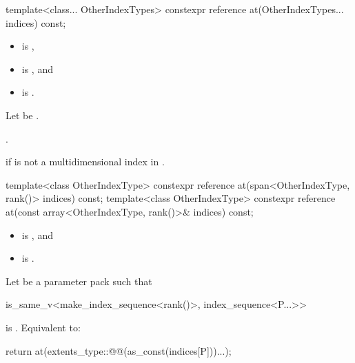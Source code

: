 %
\begin{itemdecl}
template<class... OtherIndexTypes>
  constexpr reference at(OtherIndexTypes... indices) const;
\end{itemdecl}

\begin{itemdescr}
\pnum
\constraints
\begin{itemize}
\item
{} is ,
\item
{} is , and
\item
{}  is .
\end{itemize}

\pnum
Let  be .

\pnum
\returns
{}.

\pnum
\throws
{} if  is not a multidimensional index in .
\end{itemdescr}

%
\begin{itemdecl}
template<class OtherIndexType>
  constexpr reference at(span<OtherIndexType, rank()> indices) const;
template<class OtherIndexType>
  constexpr reference at(const array<OtherIndexType, rank()>& indices) const;
\end{itemdecl}

\begin{itemdescr}
\pnum
\constraints
\begin{itemize}
\item
{} is , and
\item
{} is .
\end{itemize}

\pnum
\effects
Let  be a parameter pack such that
\begin{codeblock}
is_same_v<make_index_sequence<rank()>, index_sequence<P...>>
\end{codeblock}
is .
Equivalent to:
\begin{codeblock}
return at(extents_type::@@(as_const(indices[P]))...);
\end{codeblock}
\end{itemdescr}


